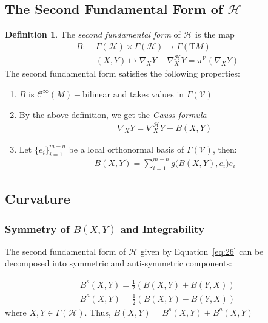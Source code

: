\documentclass[12pt]{article}
\theoremstyle{definition}
\newtheorem{definition}{Definition}[section]
\numberwithin{equation}{subsection}
\begin{document}
\subsection{The Second Fundamental Form of $\mathcal{H}$}
\begin{definition}
The \textit{second fundamental form} of $\mathcal{H}$ is the map
\begin{align}\label{eq:26}
    B : \; &\Gamma(\mathcal{H}) \times \Gamma(\mathcal{H}) \rightarrow \Gamma(\text{T}M) \\
    &(X,Y) \mapsto \nabla_X Y - \nabla^\mathcal{H}_X Y = \pi^\mathcal{V}(\nabla_X Y)
\end{align}
The second fundamental form satisfies the following properties:
\begin{enumerate}
    \item $B$ is $\mathcal{C}^\infty(M)-$bilinear and takes values in $\Gamma(\mathcal{V})$
    \item By the above definition, we get the \textit{Gauss formula}
    \begin{align*}
        \nabla_X Y = \nabla^\mathcal{H}_X Y + B(X,Y)
    \end{align*}
    \item Let $\{e_i\}_{i=1}^{m-n}$ be a local orthonormal basis of $\Gamma(\mathcal{V})$, then:
    \begin{align*}
        B(X,Y) = \sum_{i=1}^{m -n} g\big( B(X,Y) , e_i \big) e_i
    \end{align*}
\end{enumerate}
\end{definition}
\subsection{Curvature}
\subsubsection{Symmetry of $B(X,Y)$ and Integrability}
The second fundamental form of $\mathcal{H}$ given by Equation~\ref{eq:26} can be decomposed into symmetric and anti-symmetric components:

\begin{align}\label{eq:27}
    B^s(X,Y) = \frac{1}{2}(B(X,Y) + B(Y,X))  \\
    B^a(X,Y) = \frac{1}{2}(B(X,Y) - B(Y,X)) 
\end{align}
where $X,Y \in \Gamma(\mathcal{H})$. Thus, $B(X,Y) = B^s(X,Y) + B^a(X,Y)$
\end{document}
